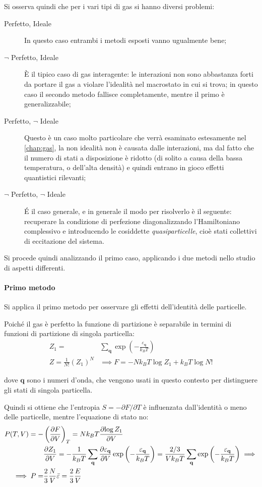 Si osserva quindi che per i vari tipi di gas si hanno diversi problemi:
\begin{description}
	\item[Perfetto, Ideale] In questo caso entrambi i metodi esposti vanno ugualmente bene;
	\item[$\neg$ Perfetto, Ideale] \`E il tipico caso di gas interagente: le interazioni non sono abbastanza forti da portare il gas a violare l'idealità nel macrostato in cui si trova; in questo caso il secondo metodo fallisce completamente, mentre il primo è generalizzabile;
	\item[Perfetto, $\neg$ Ideale] Questo è un caso molto particolare che verrà esaminato estesamente nel \cref{chap:gas}, la non idealità non è causata dalle interazioni, ma dal fatto che il numero di stati a disposizione è ridotto (di solito a causa della bassa temperatura, o dell'alta densità) e quindi entrano in gioco effetti quantistici rilevanti;
	\item[$\neg$ Perfetto, $\neg$ Ideale] \'E il caso generale, e in generale il modo per risolverlo è il seguente: recuperare la condizione di perfezione diagonalizzando l'Hamiltoniano complessivo e introducendo le cosiddette \textit{quasiparticelle}, cioè stati collettivi di eccitazione del sistema. 
\end{description}

 Si procede quindi analizzando il primo caso, applicando i due metodi nello studio di aspetti differenti.

\paragraph{Primo metodo} Si applica il primo metodo per osservare gli effetti dell'identità delle particelle.

Poiché il gas è perfetto la funzione di partizione è separabile in termini di funzioni di partizione di singola particella:
\begin{align*}
Z_1 = &\sum_{\textbf{q}} \exp \left( - \frac{\varepsilon_{\textbf{q}}}{k_B T}\right)\\
Z = \frac{1}{N!} (Z_1)^N &\implies F = -N k_B T \log Z_1 + k_B T \log N!
\end{align*}

\noindent dove $\textbf{q}$ sono i numeri d'onda, che vengono usati in questo contesto per distinguere gli stati di singola particella.

Quindi si ottiene che l'entropia $S = - \partial F / \partial T$ è influenzata dall'identità o meno delle particelle, mentre l'equazione di stato no:
\begin{align*}
P(T,V) = - &\left(\frac{\partial {F}}{\partial {V}}\right)_{T} = N k_B T \frac{\partial {\log Z_1}}{\partial {V}}\\
& \frac{\partial {Z_1}}{\partial {V}} = - \frac{1}{k_B T} \sum_{\textbf{q}} \frac{\partial {\varepsilon_{\textbf{q}}}}{\partial {V}}\exp \left( - \frac{\varepsilon_{\textbf{q}}}{k_B T}\right) = \frac{2/3}{V k_B T} \sum_{\textbf{q}} \exp \left( - \frac{\varepsilon_{\textbf{q}}}{k_B T}\right) \implies\\
\implies P = &\frac{2}{3} \frac{N}{V} \bar{\varepsilon} = \frac{2}{3} \frac{E}{V}
\end{align*}

